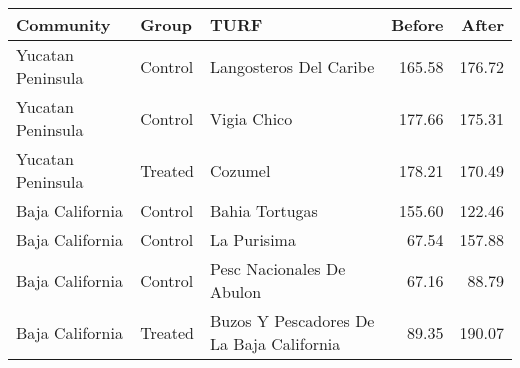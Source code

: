 
\begin{tabular}{lllrr}
\toprule
Community & Group & TURF & Before & After\\
\midrule
Yucatan Peninsula & Control & Langosteros Del Caribe & 165.58 & 176.72\\
Yucatan Peninsula & Control & Vigia Chico & 177.66 & 175.31\\
Yucatan Peninsula & Treated & Cozumel & 178.21 & 170.49\\
Baja California & Control & Bahia Tortugas & 155.60 & 122.46\\
Baja California & Control & La Purisima & 67.54 & 157.88\\
\addlinespace
Baja California & Control & Pesc Nacionales De Abulon & 67.16 & 88.79\\
Baja California & Treated & Buzos Y Pescadores De La Baja California & 89.35 & 190.07\\
\bottomrule
\end{tabular}